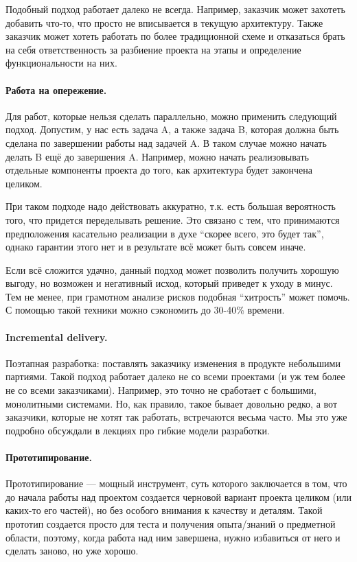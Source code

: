 \documentclass{../../text-style}
\begin{document}
Подобный подход работает далеко не всегда. Например, заказчик может захотеть добавить что-то, что просто не вписывается в текущую архитектуру. Также заказчик может хотеть работать по более традиционной схеме и отказаться брать на себя ответственность за разбиение проекта на этапы и определение функциональности на них.

\paragraph{Работа на опережение.} Для работ, которые нельзя сделать параллельно, можно применить следующий подход. Допустим, у нас есть задача A, а также задача B, которая должна быть сделана по завершении работы над задачей A. В таком случае можно начать делать B ещё до завершения A. Например, можно начать реализовывать отдельные компоненты проекта до того, как архитектура будет закончена целиком.

При таком подходе надо действовать аккуратно, т.к. есть большая вероятность того, что придется переделывать решение. Это связано с тем, что принимаются предположения касательно реализации в духе \enquote{скорее всего, это будет так}, однако гарантии этого нет и в результате всё может быть совсем иначе.

Если всё сложится удачно, данный подход может позволить получить хорошую выгоду, но возможен и негативный исход, который приведет к уходу в минус. Тем не менее, при грамотном анализе рисков подобная \enquote{хитрость} может помочь. С помощью такой техники можно сэкономить до 30-40\% времени.

\paragraph{Incremental delivery.} Поэтапная разработка: поставлять заказчику изменения в продукте небольшими партиями. Такой подход работает далеко не со всеми проектами (и уж тем более не со всеми заказчиками). Например, это точно не сработает с большими, монолитными системами. Но, как правило, такое бывает довольно редко, а вот заказчики, которые не хотят так работать, встречаются весьма часто. Мы это уже подробно обсуждали в лекциях про гибкие модели разработки.

\paragraph{Прототипирование.} Прототипирование --- мощный инструмент, суть которого заключается в том, что до начала работы над проектом создается черновой вариант проекта целиком (или каких-то его частей), но без особого внимания к качеству и деталям. Такой прототип создается просто для теста и получения опыта/знаний о предметной области, поэтому, когда работа над ним завершена, нужно избавиться от него и сделать заново, но уже хорошо.
\end{document}
